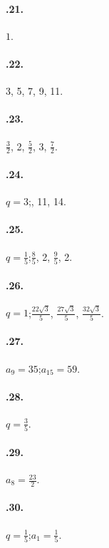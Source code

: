 \begin{multicols}{2}
\paragraph{\thechapter.21.} $1$.

\paragraph{\thechapter.22.} 3, 5, 7, 9, 11.

\paragraph{\thechapter.23.} $\frac{3}{2}$, 2, $\frac{5}{2}$, 3, $\frac{7}{2}$.

\paragraph{\thechapter.24.} $q=3$;, 11, 14.

\paragraph{\thechapter.25.} $q=\frac{1}{5}$;\quad $\frac{8}{5}$, 2, $\frac{9}{5}$, 2.

\paragraph{\thechapter.26.} $q=1$;\quad $\frac{22\sqrt{3}}{5}$, $\frac{27\sqrt{3}}{5}$, $\frac{32\sqrt{3}}{5}$.

\paragraph{\thechapter.27.} $a_9=35$;\quad $a_{15}=59$.

\paragraph{\thechapter.28.} $q=\frac{3}{5}$.

\paragraph{\thechapter.29.} $a_8=\frac{23}{2}$.

\paragraph{\thechapter.30.} $q=\frac{1}{5}$;\quad $a_1=\frac{1}{5}$.


\end{multicols}
